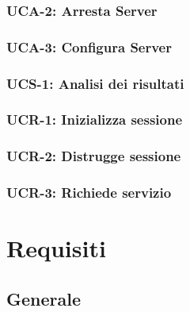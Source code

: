\subsubsection{UCA-2: Arresta Server}


\subsubsection{UCA-3: Configura Server}


\subsubsection{UCS-1: Analisi dei risultati}


\subsubsection{UCR-1: Inizializza sessione}


\subsubsection{UCR-2: Distrugge sessione}


\subsubsection{UCR-3: Richiede servizio}



\section{Requisiti}

\subsection{Generale}

